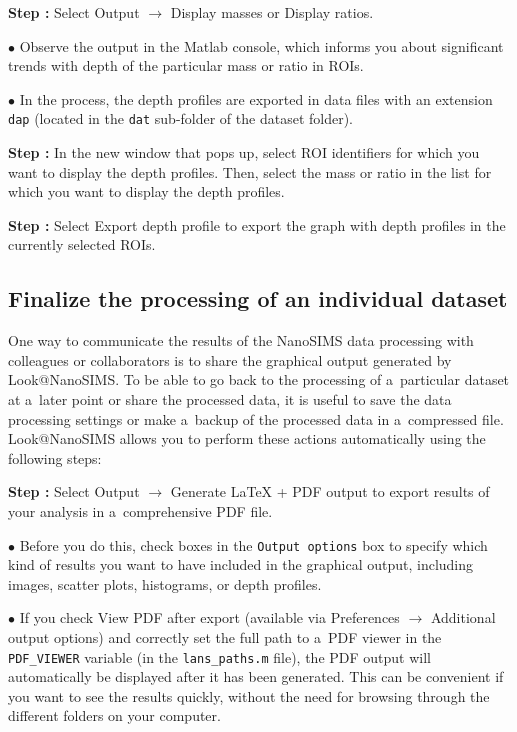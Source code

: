 \documentclass[a4paper, 11pt]{article}
\newcommand{\ttt}[1]{\texttt{#1}}
\newcommand{\lans}[1]{{\color{magenta}#1}}
\newcommand{\lanscb}[1]{{\color{darkgreen}#1}}
\newcommand\ra{\rightarrow}
\newcounter{step}
\newcommand\s{\addtocounter{step}{1}\noindent\textbf{Step \thestep:}{ }}
\newcommand\bul{\noindent$\bullet${ }}
\begin{document}
\s Select \lans{Output} $\ra$ \lans{Display masses} or \lans{Display ratios}.

\bul Observe the output in the Matlab console, which informs you about significant trends with depth of the particular mass or ratio in ROIs.

\bul In the process, the depth profiles are exported in data files with an extension \ttt{dap} (located in the \ttt{dat} sub-folder of the dataset folder).

\s In the new window that pops up, select ROI identifiers for which you want to display the depth profiles. Then, select the mass or ratio in the list for which you want to display the depth profiles.

\s Select \lans{Export depth profile} to export the graph with depth profiles in the currently selected ROIs.


\subsection{Finalize the processing of an individual dataset}
\setcounter{step}{0}

One way to communicate the results of the NanoSIMS data processing with colleagues or collaborators is to share the graphical output generated by Look@NanoSIMS. To be able to go back to the processing of a~particular dataset at a~later point or share the processed data, it is useful to save the data processing settings or make a~backup of the processed data in a~compressed file. Look@NanoSIMS allows you to perform these actions automatically using the following steps:

\s Select \lans{Output} $\ra$ \lans{Generate LaTeX + PDF output} to export results of your analysis in a~comprehensive PDF file. 

\bul Before you do this, check boxes in the \ttt{Output options} box to specify which kind of results you want to have included in the graphical output, including  \lanscb{images}, \lanscb{scatter plots}, \lanscb{histograms}, or \lanscb{depth profiles}.

\bul If you check \lanscb{View PDF after export} (available via \lans{Preferences} $\ra$ \lans{Additional output options}) and correctly set the full path to a~PDF viewer in the \ttt{PDF\_VIEWER} variable (in the \ttt{lans\_paths.m} file), the PDF output will automatically be displayed after it has been generated. This can be convenient if you want to see the results quickly, without the need for browsing through the different folders on your computer.
\end{document}
